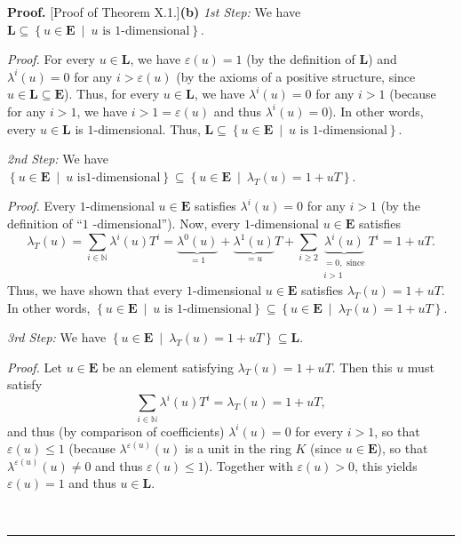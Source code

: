 \documentclass[numbers=enddot,12pt,final,onecolumn,notitlepage]{scrartcl}%
\newenvironment{proof}[1][Proof]{\noindent\textbf{#1.} }{\ \rule{0.5em}{0.5em}}
\begin{document}
\begin{proof}
[Proof of Theorem X.1.]\textbf{(b)} \textit{1st Step:} We have $\mathbf{L}%
\subseteq\left\{  u\in\mathbf{E}\ \mid\ u\text{ is }1\text{-dimensional}%
\right\}  $.

\textit{Proof.} For every $u\in\mathbf{L}$, we have $\varepsilon\left(
u\right)  =1$ (by the definition of $\mathbf{L}$) and $\lambda^{i}\left(
u\right)  =0$ for any $i>\varepsilon\left(  u\right)  $ (by the axioms of a
positive structure, since $u\in\mathbf{L}\subseteq\mathbf{E}$). Thus, for
every $u\in\mathbf{L}$, we have $\lambda^{i}\left(  u\right)  =0$ for any
$i>1$ (because for any $i>1$, we have $i>1=\varepsilon\left(  u\right)  $ and
thus $\lambda^{i}\left(  u\right)  =0$). In other words, every $u\in
\mathbf{L}$ is $1$-dimensional. Thus, $\mathbf{L}\subseteq\left\{
u\in\mathbf{E}\ \mid\ u\text{ is }1\text{-dimensional}\right\}  $.

\textit{2nd Step:} We have $\left\{  u\in\mathbf{E}\ \mid\ u\text{ is
}1\text{-dimensional}\right\}  \subseteq\left\{  u\in\mathbf{E}\ \mid
\ \lambda_{T}\left(  u\right)  =1+uT\right\}  $.

\textit{Proof.} Every $1$-dimensional $u\in\mathbf{E}$ satisfies $\lambda
^{i}\left(  u\right)  =0$ for any $i>1$ (by the definition of ``$1$%
-dimensional''). Now, every $1$-dimensional $u\in\mathbf{E}$ satisfies%
\[
\lambda_{T}\left(  u\right)  =\sum\limits_{i\in\mathbb{N}}\lambda^{i}\left(
u\right)  T^{i}=\underbrace{\lambda^{0}\left(  u\right)  }_{=1}%
+\underbrace{\lambda^{1}\left(  u\right)  }_{=u}T+\sum\limits_{i\geq
2}\underbrace{\lambda^{i}\left(  u\right)  }_{\substack{=0,\text{ since}%
\\i>1}}T^{i}=1+uT.
\]
Thus, we have shown that every $1$-dimensional $u\in\mathbf{E}$ satisfies
$\lambda_{T}\left(  u\right)  =1+uT$. In other words, $\left\{  u\in
\mathbf{E}\ \mid\ u\text{ is }1\text{-dimensional}\right\}  \subseteq\left\{
u\in\mathbf{E}\ \mid\ \lambda_{T}\left(  u\right)  =1+uT\right\}  $.

\textit{3rd Step:} We have $\left\{  u\in\mathbf{E}\ \mid\ \lambda_{T}\left(
u\right)  =1+uT\right\}  \subseteq\mathbf{L}$.

\textit{Proof.} Let $u\in\mathbf{E}$ be an element satisfying $\lambda
_{T}\left(  u\right)  =1+uT$. Then this $u$ must satisfy%
\[
\sum\limits_{i\in\mathbb{N}}\lambda^{i}\left(  u\right)  T^{i}=\lambda
_{T}\left(  u\right)  =1+uT,
\]
and thus (by comparison of coefficients) $\lambda^{i}\left(  u\right)  =0$ for
every $i>1$, so that $\varepsilon\left(  u\right)  \leq1$ (because
$\lambda^{\varepsilon\left(  u\right)  }\left(  u\right)  $ is a unit in the
ring $K$ (since $u\in\mathbf{E}$), so that $\lambda^{\varepsilon\left(
u\right)  }\left(  u\right)  \neq0$ and thus $\varepsilon\left(  u\right)
\leq1$). Together with $\varepsilon\left(  u\right)  >0$, this yields
$\varepsilon\left(  u\right)  =1$ and thus $u\in\mathbf{L}$.


\end{proof}
\end{document}
